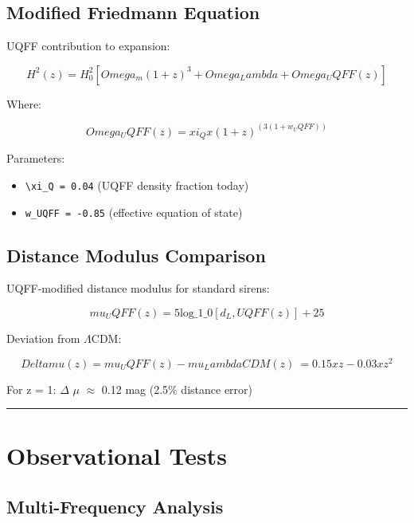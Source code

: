 \documentclass[12pt,a4paper]{article}
\begin{document}
\subsection{Modified Friedmann Equation}

UQFF contribution to expansion:

\begin{equation}
H^2(z) = H_0^2 [Omega_m(1+z)^3 + Omega_Lambda + Omega_UQFF(z)]
\end{equation}

Where:

\begin{equation}
Omega_UQFF(z) = xi_Q x (1+z)^(3(1+w_UQFF))
\end{equation}

Parameters:

\begin{itemize}
  \item \texttt{\textbackslash xi\_Q = 0.04} (UQFF density fraction today)
  \item \texttt{w\_UQFF = -0.85} (effective equation of state)
\end{itemize}

\subsection{Distance Modulus Comparison}

UQFF-modified distance modulus for standard sirens:

\begin{equation}
mu_UQFF(z) = 5 \text{log\_1\_0}[d_L,UQFF(z)] + 25
\end{equation}

Deviation from $\Lambda$CDM:

\begin{equation}
Deltamu(z) = mu_UQFF(z) - mu_LambdaCDM(z) ~= 0.15 x z - 0.03 x z^2
\end{equation}

For z = 1: $\Delta$ $\mu$ $\approx$ 0.12 mag (2.5\% distance error)

\medskip\hrule\medskip

\section{Observational Tests}

\subsection{Multi-Frequency Analysis}
\end{document}
